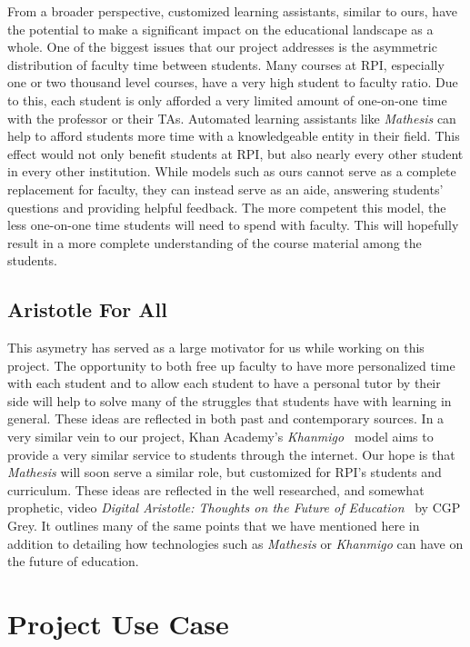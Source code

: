 \documentclass[12pt,a4paper]{article}
\begin{document}
    From a broader perspective, customized learning assistants, similar to ours, have the potential
    to make a significant impact on the educational landscape as a whole.  One of the biggest issues
    that our project addresses is the asymmetric distribution of faculty time between students.
    Many courses at RPI, especially one or two thousand level courses, have a very high student to
    faculty ratio.  Due to this, each student is only afforded a very limited amount of one-on-one
    time with the professor or their TAs.  Automated learning assistants like \textit{Mathesis} can
    help to afford students more time with a knowledgeable entity in their field.  This effect would
    not only benefit students at RPI, but also nearly every other student in every other institution.
    While models such as ours cannot serve as a complete replacement for faculty, they can instead
    serve as an aide, answering students' questions and providing helpful feedback.  The more
    competent this model, the less one-on-one time students will need to spend with faculty.  This
    will hopefully result in a more complete understanding of the course material among the students.

    \subsection{Aristotle For All}

    This asymetry has served as a large motivator for us while working on this project.  The opportunity to
    both free up faculty to have more personalized time with each student and to allow each student
    to have a personal tutor by their side will help to solve many of the struggles that students
    have with learning in general.  These ideas are reflected in both past and contemporary sources.
    In a very similar vein to our project, Khan Academy's \textit{Khanmigo}~\cite{khanmigo} model
    aims to provide a very similar service to students through the internet.  Our hope is that
    \textit{Mathesis} will soon serve a similar role, but customized for RPI's students and
    curriculum.  These ideas are reflected in the well researched, and somewhat prophetic, video
    \textit{Digital Aristotle: Thoughts on the Future of Education}~\cite{aristotle} by CGP Grey.  It outlines
    many of the same points that we have mentioned here in addition to detailing how technologies
    such as \textit{Mathesis} or \textit{Khanmigo} can have on the future of education.

    \section{Project Use Case}
\end{document}
